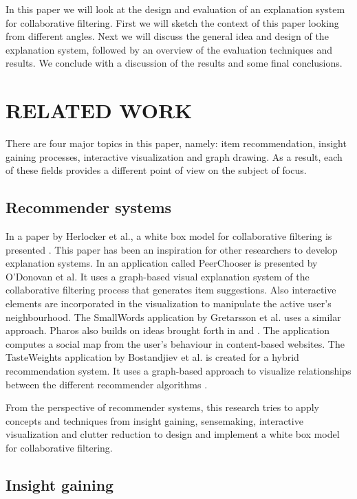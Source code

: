\documentclass[a4paper,10pt,twocolumn]{article}
\begin{document}
In this paper we will look at the design and evaluation of an explanation system for collaborative filtering. First we will sketch the context of this paper looking from different angles. Next we will discuss the general idea and design of the explanation system, followed by an overview of the evaluation techniques and results. We conclude with a discussion of the results and some final conclusions.


\section*{RELATED WORK}

There are four major topics in this paper, namely: item recommendation, insight gaining processes, interactive visualization and graph drawing. As a result, each of these fields provides a different point of view on the subject of focus.


\subsection*{Recommender systems}

In a paper by Herlocker et al., a white box model for collaborative filtering is presented \cite{herlocker2000}. This paper has been an inspiration for other researchers to develop explanation systems. In \cite{o'donovan2008} an application called PeerChooser is presented by O'Donovan et al. It uses a graph-based visual explanation system of the collaborative filtering process that generates item suggestions. Also interactive elements are incorporated in the visualization to manipulate the active user's neighbourhood. The SmallWords application by Gretarsson et al. \cite{gretarsson2010} uses a similar approach. Pharos \cite{zhao2010} also builds on ideas brought forth in \cite{herlocker2000} and \cite{o'donovan2008}. The application computes a social map from the user's behaviour in content-based websites. The TasteWeights application by Bostandjiev et al. is created for a hybrid recommendation system. It uses a graph-based approach to visualize relationships between the different recommender algorithms \cite{bostandjiev2012}.

From the perspective of recommender systems, this research tries to apply concepts and techniques from insight gaining, sensemaking, interactive visualization and clutter reduction to design and implement a white box model for collaborative filtering.


\subsection*{Insight gaining}
\end{document}
